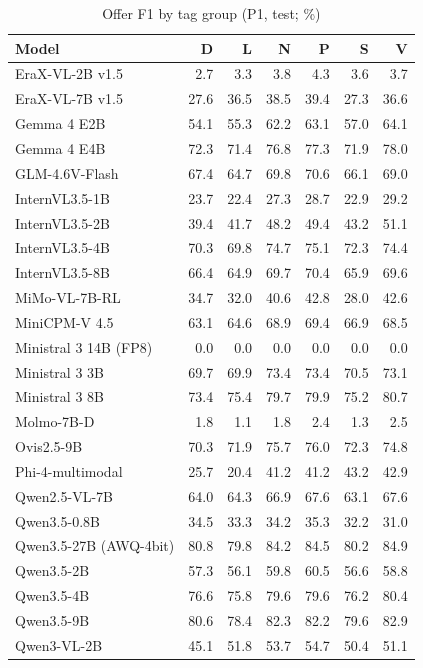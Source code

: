 \begin{table}[t]
\centering
\caption{Offer F1 by tag group (P1, test; \%)}
\label{tab:taggroups}
\small
\begin{tabular}{lrrrrrr}
\toprule
Model & D & L & N & P & S & V \\
\midrule
EraX-VL-2B v1.5 & 2.7 & 3.3 & 3.8 & 4.3 & 3.6 & 3.7 \\
EraX-VL-7B v1.5 & 27.6 & 36.5 & 38.5 & 39.4 & 27.3 & 36.6 \\
Gemma 4 E2B & 54.1 & 55.3 & 62.2 & 63.1 & 57.0 & 64.1 \\
Gemma 4 E4B & 72.3 & 71.4 & 76.8 & 77.3 & 71.9 & 78.0 \\
GLM-4.6V-Flash & 67.4 & 64.7 & 69.8 & 70.6 & 66.1 & 69.0 \\
InternVL3.5-1B & 23.7 & 22.4 & 27.3 & 28.7 & 22.9 & 29.2 \\
InternVL3.5-2B & 39.4 & 41.7 & 48.2 & 49.4 & 43.2 & 51.1 \\
InternVL3.5-4B & 70.3 & 69.8 & 74.7 & 75.1 & 72.3 & 74.4 \\
InternVL3.5-8B & 66.4 & 64.9 & 69.7 & 70.4 & 65.9 & 69.6 \\
MiMo-VL-7B-RL & 34.7 & 32.0 & 40.6 & 42.8 & 28.0 & 42.6 \\
MiniCPM-V 4.5 & 63.1 & 64.6 & 68.9 & 69.4 & 66.9 & 68.5 \\
Ministral 3 14B (FP8) & 0.0 & 0.0 & 0.0 & 0.0 & 0.0 & 0.0 \\
Ministral 3 3B & 69.7 & 69.9 & 73.4 & 73.4 & 70.5 & 73.1 \\
Ministral 3 8B & 73.4 & 75.4 & 79.7 & 79.9 & 75.2 & 80.7 \\
Molmo-7B-D & 1.8 & 1.1 & 1.8 & 2.4 & 1.3 & 2.5 \\
Ovis2.5-9B & 70.3 & 71.9 & 75.7 & 76.0 & 72.3 & 74.8 \\
Phi-4-multimodal & 25.7 & 20.4 & 41.2 & 41.2 & 43.2 & 42.9 \\
Qwen2.5-VL-7B & 64.0 & 64.3 & 66.9 & 67.6 & 63.1 & 67.6 \\
Qwen3.5-0.8B & 34.5 & 33.3 & 34.2 & 35.3 & 32.2 & 31.0 \\
Qwen3.5-27B (AWQ-4bit) & 80.8 & 79.8 & 84.2 & 84.5 & 80.2 & 84.9 \\
Qwen3.5-2B & 57.3 & 56.1 & 59.8 & 60.5 & 56.6 & 58.8 \\
Qwen3.5-4B & 76.6 & 75.8 & 79.6 & 79.6 & 76.2 & 80.4 \\
Qwen3.5-9B & 80.6 & 78.4 & 82.3 & 82.2 & 79.6 & 82.9 \\
Qwen3-VL-2B & 45.1 & 51.8 & 53.7 & 54.7 & 50.4 & 51.1 \\

\end{tabular}
\end{table}
